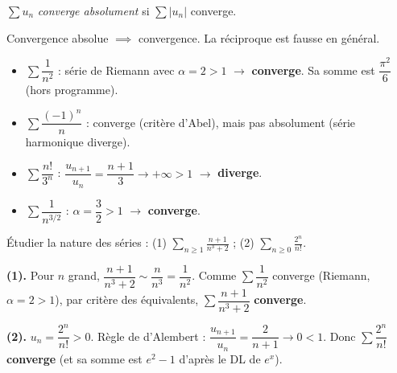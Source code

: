 \documentclass[11pt,a4paper,twoside]{book}
\begin{document}
\begin{definitionbox}
$\sum u_n$ \emph{converge absolument} si $\sum |u_n|$ converge.
\end{definitionbox}

\begin{theoremebox}
Convergence absolue $\implies$ convergence. La réciproque est fausse en général.
\end{theoremebox}

\begin{exemplebox}
\begin{itemize}
  \item $\sum \dfrac{1}{n^2}$ : série de Riemann avec $\alpha=2>1$ $\to$ \textbf{converge}. Sa somme est $\dfrac{\pi^2}{6}$ (hors programme).
  \item $\sum \dfrac{(-1)^n}{n}$ : converge (critère d'Abel), mais pas absolument (série harmonique diverge).
  \item $\sum \dfrac{n!}{3^n}$ : $\dfrac{u_{n+1}}{u_n} = \dfrac{n+1}{3} \to +\infty > 1$ $\to$ \textbf{diverge}.
  \item $\sum \dfrac{1}{n^{3/2}}$ : $\alpha = \dfrac{3}{2} > 1$ $\to$ \textbf{converge}.
\end{itemize}
\end{exemplebox}

\begin{exercicebox}
Étudier la nature des séries : (1) $\displaystyle\sum_{n\geq 1} \frac{n+1}{n^3+2}$ ;
\quad (2) $\displaystyle\sum_{n\geq 0} \frac{2^n}{n!}$.
\end{exercicebox}

\begin{correctionbox}[Correction]
\textbf{(1).} Pour $n$ grand, $\dfrac{n+1}{n^3+2} \sim \dfrac{n}{n^3} = \dfrac{1}{n^2}$.
Comme $\sum \dfrac{1}{n^2}$ converge (Riemann, $\alpha=2>1$), par critère des équivalents, $\sum \dfrac{n+1}{n^3+2}$ \textbf{converge}.

\textbf{(2).} $u_n = \dfrac{2^n}{n!} > 0$. Règle de d'Alembert :
$\dfrac{u_{n+1}}{u_n} = \dfrac{2}{n+1} \to 0 < 1$.
Donc $\sum \dfrac{2^n}{n!}$ \textbf{converge} (et sa somme est $e^2 - 1$ d'après le DL de $e^x$).
\end{correctionbox}
\end{document}
